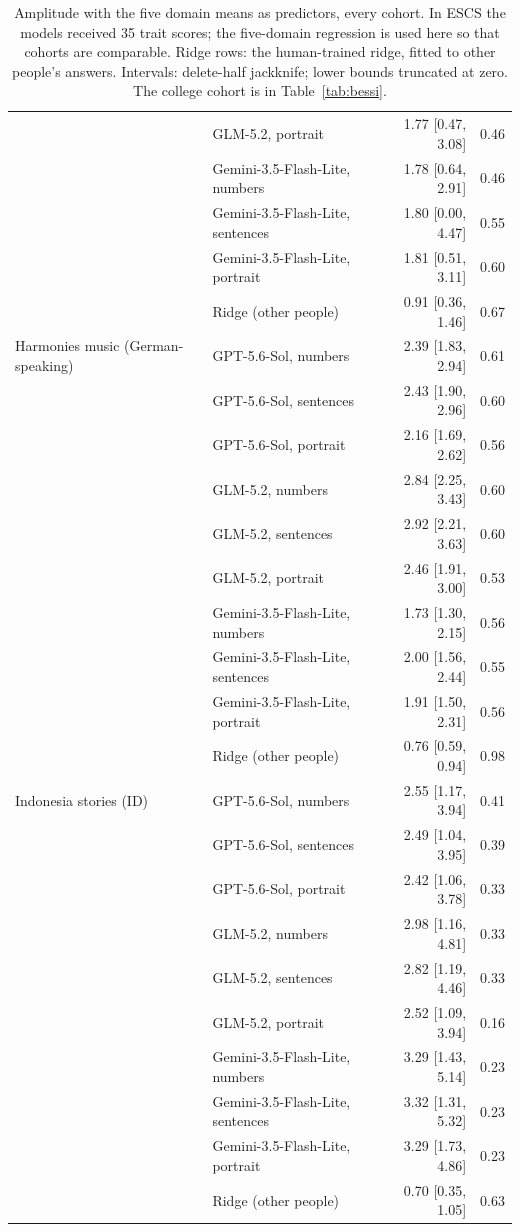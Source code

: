 \begin{table}[p]
\begin{tabular}{@{}llrr@{}}
 & GLM-5.2, portrait & 1.77 [0.47, 3.08] & 0.46 \\
 & Gemini-3.5-Flash-Lite, numbers & 1.78 [0.64, 2.91] & 0.46 \\
 & Gemini-3.5-Flash-Lite, sentences & 1.80 [0.00, 4.47] & 0.55 \\
 & Gemini-3.5-Flash-Lite, portrait & 1.81 [0.51, 3.11] & 0.60 \\
 & Ridge (other people) & 0.91 [0.36, 1.46] & 0.67 \\
\midrule
Harmonies music (German-speaking) & GPT-5.6-Sol, numbers & 2.39 [1.83, 2.94] & 0.61 \\
 & GPT-5.6-Sol, sentences & 2.43 [1.90, 2.96] & 0.60 \\
 & GPT-5.6-Sol, portrait & 2.16 [1.69, 2.62] & 0.56 \\
 & GLM-5.2, numbers & 2.84 [2.25, 3.43] & 0.60 \\
 & GLM-5.2, sentences & 2.92 [2.21, 3.63] & 0.60 \\
 & GLM-5.2, portrait & 2.46 [1.91, 3.00] & 0.53 \\
 & Gemini-3.5-Flash-Lite, numbers & 1.73 [1.30, 2.15] & 0.56 \\
 & Gemini-3.5-Flash-Lite, sentences & 2.00 [1.56, 2.44] & 0.55 \\
 & Gemini-3.5-Flash-Lite, portrait & 1.91 [1.50, 2.31] & 0.56 \\
 & Ridge (other people) & 0.76 [0.59, 0.94] & 0.98 \\
\midrule
Indonesia stories (ID) & GPT-5.6-Sol, numbers & 2.55 [1.17, 3.94] & 0.41 \\
 & GPT-5.6-Sol, sentences & 2.49 [1.04, 3.95] & 0.39 \\
 & GPT-5.6-Sol, portrait & 2.42 [1.06, 3.78] & 0.33 \\
 & GLM-5.2, numbers & 2.98 [1.16, 4.81] & 0.33 \\
 & GLM-5.2, sentences & 2.82 [1.19, 4.46] & 0.33 \\
 & GLM-5.2, portrait & 2.52 [1.09, 3.94] & 0.16 \\
 & Gemini-3.5-Flash-Lite, numbers & 3.29 [1.43, 5.14] & 0.23 \\
 & Gemini-3.5-Flash-Lite, sentences & 3.32 [1.31, 5.32] & 0.23 \\
 & Gemini-3.5-Flash-Lite, portrait & 3.29 [1.73, 4.86] & 0.23 \\
 & Ridge (other people) & 0.70 [0.35, 1.05] & 0.63 \\
\bottomrule\end{tabular}
\caption{Amplitude with the five domain means as predictors, every cohort. In ESCS the models received 35 trait scores; the five-domain regression is used here so that cohorts are comparable. Ridge rows: the human-trained ridge, fitted to other people's answers. Intervals: delete-half jackknife; lower bounds truncated at zero. The college cohort is in Table~\ref{tab:bessi}.}
\label{tab:amp5}\end{table}

